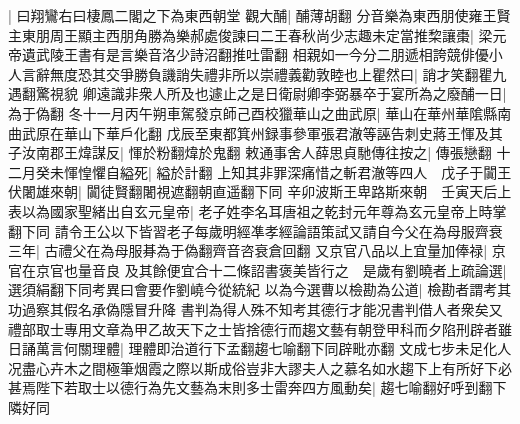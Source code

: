 |{
	曰翔鸞右曰棲鳳二閣之下為東西朝堂}
觀大酺|{
	酺薄胡翻}
分音樂為東西朋使雍王賢主東朋周王顯主西朋角勝為樂郝處俊諫曰二王春秋尚少志趣未定當推棃讓棗|{
	梁元帝遺武陵王書有是言樂音洛少詩沼翻推吐雷翻}
相親如一今分二朋遞相誇競俳優小人言辭無度恐其交爭勝負譏誚失禮非所以崇禮義勸敦睦也上瞿然曰|{
	誚才笑翻瞿九遇翻驚視貌}
卿遠識非衆人所及也遽止之是日衛尉卿李弼暴卒于宴所為之廢酺一日|{
	為于偽翻}
冬十一月丙午朔車駕發京師己酉校獵華山之曲武原|{
	華山在華州華隂縣南曲武原在華山下華戶化翻}
戊辰至東都箕州録事參軍張君澈等誣告刺史蔣王惲及其子汝南郡王煒謀反|{
	惲於粉翻煒於鬼翻}
敕通事舍人薛思貞馳傳往按之|{
	傳張戀翻}
十二月癸未惲惶懼自縊死|{
	縊於計翻}
上知其非罪深痛惜之斬君澈等四人　戊子于闐王伏闍雄來朝|{
	闐徒賢翻闍視遮翻朝直遥翻下同}
辛卯波斯王卑路斯來朝　壬寅天后上表以為國家聖緒出自玄元皇帝|{
	老子姓李名耳唐祖之乾封元年尊為玄元皇帝上時掌翻下同}
請令王公以下皆習老子每歲明經凖孝經論語策試又請自今父在為母服齊衰三年|{
	古禮父在為母服朞為于偽翻齊音咨衰倉回翻}
又京官八品以上宜量加俸禄|{
	京官在京官也量音良}
及其餘便宜合十二條詔書褒美皆行之　是歲有劉曉者上疏論選|{
	選須絹翻下同考異曰會要作劉嶢今從統紀}
以為今選曹以檢勘為公道|{
	檢勘者謂考其功過察其假名承偽隱冒升降}
書判為得人殊不知考其德行才能况書判借人者衆矣又禮部取士專用文章為甲乙故天下之士皆捨德行而趨文藝有朝登甲科而夕陷刑辟者雖日誦萬言何關理體|{
	理體即治道行下孟翻趨七喻翻下同辟毗亦翻}
文成七步未足化人况盡心卉木之間極筆烟霞之際以斯成俗豈非大謬夫人之慕名如水趨下上有所好下必甚焉陛下若取士以德行為先文藝為末則多士雷奔四方風動矣|{
	趨七喻翻好呼到翻下隣好同}


